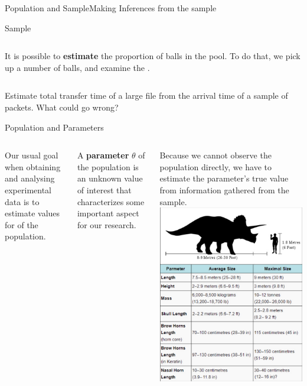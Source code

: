 \begin{frame}{Population and Sample}{Making Inferences from the sample}
\begin{block}{Sample}
\begin{columns}
      It is possible to {\bf estimate} the proportion of balls in the pool. To do that, we pick up a number of balls, and examine the .
    \end{columns}
  \end{block}

   Estimate total transfer time of
  a large file from the arrival time of a sample of packets.
  What could go wrong?
\end{frame}

\begin{frame}{Population and Parameters}
  \begin{columns}
      Our usual goal when obtaining and analysing experimental data is to estimate values for  of the population.\bigskip

      A {\bf parameter} $\theta$ of the population is an unknown value of interest that characterizes some important aspect for our research.\bigskip

      Because we cannot observe the population directly, we have to estimate the parameter's true value from information gathered from the sample.
    \includegraphics[width=1\textwidth]{../img/wikipedia_triceratops}
  \end{columns}
\end{frame}



